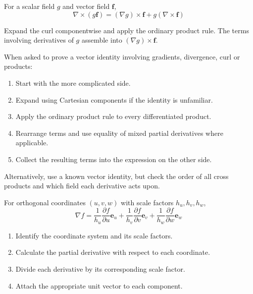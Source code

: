 \begin{method}
  For a scalar field $g$ and vector field $\boldsymbol{f}$,
  \[
  \boxed{
  \nabla\times(g\boldsymbol{f})
  =(\nabla g)\times\boldsymbol{f}
  +g(\nabla\times\boldsymbol{f})
  }
  \]

  Expand the curl componentwise and apply the ordinary product rule. The terms involving derivatives of $g$ assemble into $(\nabla g)\times\boldsymbol{f}$.
\end{method}

\begin{method}
  When asked to prove a vector identity involving gradients, divergence, curl or products:

  \begin{enumerate}
    \item Start with the more complicated side.
    \item Expand using Cartesian components if the identity is unfamiliar.
    \item Apply the ordinary product rule to every differentiated product.
    \item Rearrange terms and use equality of mixed partial derivatives where applicable.
    \item Collect the resulting terms into the expression on the other side.
  \end{enumerate}

  Alternatively, use a known vector identity, but check the order of all cross products and which field each derivative acts upon.
\end{method}

\begin{method}
  For orthogonal coordinates $(u,v,w)$ with scale factors $h_u,h_v,h_w$,
  \[
  \boxed{
  \nabla f=
  \frac{1}{h_u}\frac{\partial f}{\partial u}\boldsymbol{e}_u
  +\frac{1}{h_v}\frac{\partial f}{\partial v}\boldsymbol{e}_v
  +\frac{1}{h_w}\frac{\partial f}{\partial w}\boldsymbol{e}_w
  }
  \]

  \begin{enumerate}
    \item Identify the coordinate system and its scale factors.
    \item Calculate the partial derivative with respect to each coordinate.
    \item Divide each derivative by its corresponding scale factor.
    \item Attach the appropriate unit vector to each component.
  \end{enumerate}
\end{method}

